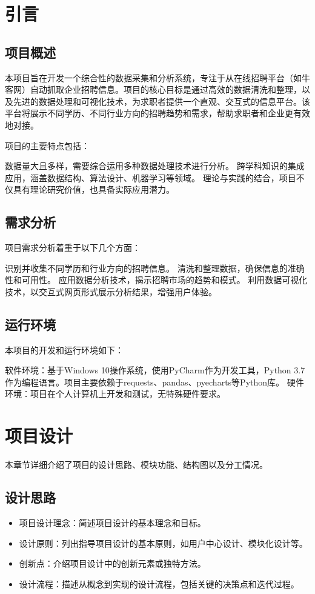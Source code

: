 \documentclass{xdutlabreport}
\begin{document}
\maketitle
\section{引言}

\subsection{项目概述}
本项目旨在开发一个综合性的数据采集和分析系统，专注于从在线招聘平台（如牛客网）自动抓取企业招聘信息。项目的核心目标是通过高效的数据清洗和整理，以及先进的数据处理和可视化技术，为求职者提供一个直观、交互式的信息平台。该平台将展示不同学历、不同行业方向的招聘趋势和需求，帮助求职者和企业更有效地对接。

项目的主要特点包括：

数据量大且多样，需要综合运用多种数据处理技术进行分析。
跨学科知识的集成应用，涵盖数据结构、算法设计、机器学习等领域。
理论与实践的结合，项目不仅具有理论研究价值，也具备实际应用潜力。
\subsection{需求分析}
项目需求分析着重于以下几个方面：

识别并收集不同学历和行业方向的招聘信息。
清洗和整理数据，确保信息的准确性和可用性。
应用数据分析技术，揭示招聘市场的趋势和模式。
利用数据可视化技术，以交互式网页形式展示分析结果，增强用户体验。
\subsection{运行环境}
本项目的开发和运行环境如下：

软件环境：基于Windows 10操作系统，使用PyCharm作为开发工具，Python 3.7作为编程语言。项目主要依赖于requests、pandas、pyecharts等Python库。
硬件环境：项目在个人计算机上开发和测试，无特殊硬件要求。



\newpage

\section{项目设计}
本章节详细介绍了项目的设计思路、模块功能、结构图以及分工情况。

\subsection{设计思路}
\begin{itemize}
    \item 项目设计理念：简述项目设计的基本理念和目标。
    \item 设计原则：列出指导项目设计的基本原则，如用户中心设计、模块化设计等。
    \item 创新点：介绍项目设计中的创新元素或独特方法。
    \item 设计流程：描述从概念到实现的设计流程，包括关键的决策点和迭代过程。
\end{itemize}
\end{document}
